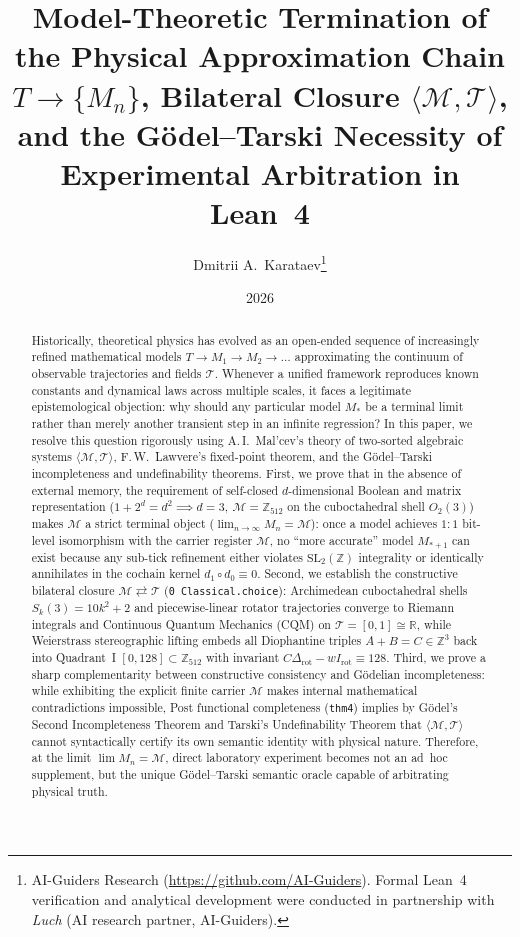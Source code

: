 \documentclass[11pt,a4paper]{article}
\title{\textbf{Model-Theoretic Termination of the Physical Approximation Chain $T \to \{M_n\}$, Bilateral Closure $\langle\mathcal{M},\mathcal{T}\rangle$, and the G\"odel--Tarski Necessity of Experimental Arbitration in Lean~4}}
\author{Dmitrii A.~Karataev\thanks{AI-Guiders Research (\url{https://github.com/AI-Guiders}). Formal Lean~4 verification and analytical development were conducted in partnership with \emph{Luch} (AI research partner, AI-Guiders).}}
\date{2026}
\theoremstyle{definition}
\theoremstyle{remark}
\begin{document}
\maketitle

\begin{abstract}
Historically, theoretical physics has evolved as an open-ended sequence of increasingly refined mathematical models $T \to M_1 \to M_2 \to \dots$ approximating the continuum of observable trajectories and fields $\mathcal{T}$. Whenever a unified framework reproduces known constants and dynamical laws across multiple scales, it faces a legitimate epistemological objection: why should any particular model $M_*$ be a terminal limit rather than merely another transient step in an infinite regression? In this paper, we resolve this question rigorously using A.\,I.~Mal'cev's theory of two-sorted algebraic systems $\langle\mathcal{M},\mathcal{T}\rangle$, F.\,W.~Lawvere's fixed-point theorem, and the G\"odel--Tarski incompleteness and undefinability theorems. First, we prove that in the absence of external memory, the requirement of self-closed $d$-dimensional Boolean and matrix representation ($1 + 2^d = d^2 \implies d = 3,\ \mathcal{M} = \mathbb{Z}_{512}$ on the cuboctahedral shell $O_2(3)$) makes $\mathcal{M}$ a strict terminal object ($\lim_{n\to\infty} M_n = \mathcal{M}$): once a model achieves $1:1$ bit-level isomorphism with the carrier register $\mathcal{M}$, no ``more accurate'' model $M_{*+1}$ can exist because any sub-tick refinement either violates $\mathrm{SL}_2(\mathbb{Z})$ integrality or identically annihilates in the cochain kernel $d_1\circ d_0 \equiv 0$. Second, we establish the constructive bilateral closure $\mathcal{M} \rightleftarrows \mathcal{T}$ (\texttt{0 Classical.choice}): Archimedean cuboctahedral shells $S_k(3) = 10k^2 + 2$ and piecewise-linear rotator trajectories converge to Riemann integrals and Continuous Quantum Mechanics (CQM) on $\mathcal{T} = [0,1]\cong\mathbb{R}$, while Weierstrass stereographic lifting embeds all Diophantine triples $A+B=C\in\mathbb{Z}^3$ back into Quadrant~I $[0,128]\subset\mathbb{Z}_{512}$ with invariant $C\Delta_{\mathrm{rot}} - w I_{\mathrm{rot}} \equiv 128$. Third, we prove a sharp complementarity between constructive consistency and G\"odelian incompleteness: while exhibiting the explicit finite carrier $\mathcal{M}$ makes internal mathematical contradictions impossible, Post functional completeness (\texttt{thm4}) implies by G\"odel's Second Incompleteness Theorem and Tarski's Undefinability Theorem that $\langle\mathcal{M},\mathcal{T}\rangle$ cannot syntactically certify its own semantic identity with physical nature. Therefore, at the limit $\lim M_n = \mathcal{M}$, direct laboratory experiment becomes not an ad~hoc supplement, but the unique G\"odel--Tarski semantic oracle capable of arbitrating physical truth.
\end{abstract}
\end{document}

